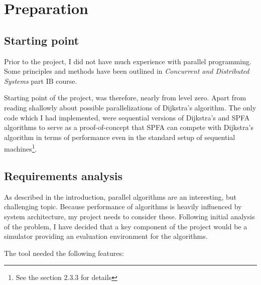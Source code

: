 \documentclass[12pt,a4paper,twoside,openright]{report}
\begin{document}
\chapter{Preparation}
\section{Starting point}
Prior to the project, I did not have much experience with parallel programming. Some principles and methods have been outlined in \textit{Concurrent and Distributed Systems} part IB course.

Starting point of the project, was therefore, nearly from level zero. Apart from reading shallowly about possible parallelizations of Dijkstra's algorithm. The only code which I had implemented, were sequential versions of Dijkstra's and SPFA algorithms to serve as a proof-of-concept that SPFA can compete with Dijkstra's algorithm in terms of performance even in the standard setup of sequential machines\footnote{See the section $2.3.3$ for details}.

\section{Requirements analysis}
As described in the introduction, parallel algorithms are an interesting, but challenging topic. Because performance of algorithms is heavily influenced by system architecture, my project needs to consider these. Following initial analysis of the problem, I have decided that a key component of the project would be a simulator providing an evaluation environment for the algorithms.

The tool needed the following features:
\end{document}
